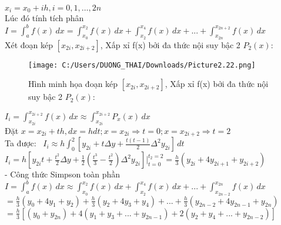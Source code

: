 \documentclass[14pt,a4paper]{article}
\begin{document}
 	   \hspace*{30pt}${\displaystyle x_i=x_0+ih ,i=0,1,…,2n }$ \\
 	   \hspace*{30pt} Lúc đó tính tích phân ${\displaystyle I= \int_{a}^{b}f(x)\,dx =\int_{x_0}^{x_2}f(x)\,dx +\int_{x_2}^{x_4}f(x)\,dx+ ... + \int_{x_{2n}}^{x_{2n+2}}f(x)\,dx}$ \\
 	   \hspace*{30pt} Xét đoạn kép ${\displaystyle  [x_{2i}, x_{2i+2}]}$, Xấp xỉ f(x) bởi đa thức nội suy bậc 2 ${\displaystyle P_2 (x): }$ \\ \vspace{9pt}
\begin{figure}[H]
	\centering
	\texttt{[image: C:/Users/DUONG\_THAI/Downloads/Picture2.22.png]}
	\caption[ Hình minh họa đoạn kép ${\displaystyle  [x_{2i}, x_{2i+2}]}$, Xấp xỉ f(x) bởi đa thức nội suy bậc 2 ${\displaystyle P_2 (x): }$]{ Hình minh họa đoạn kép ${\displaystyle  [x_{2i}, x_{2i+2}]}$, Xấp xỉ f(x) bởi đa thức nội suy bậc 2 ${\displaystyle P_2 (x): }$}
	\label{hinh22}
\end{figure} 	     
 	  \vspace{9pt} \hspace*{30pt} ${\displaystyle I_i= \int_{x_{2i}}^{x_{2i+2}}f(x)\,dx \approx \int_{x_{2i}}^{x_{2i+2}}P_x(x)\,dx}$ \\ 
 	 \vspace*{9pt} \hspace*{30pt} Đặt ${\displaystyle x= x_{2i} +th , dx= hdt ; x=x_{2i} \Rightarrow t=0 ; x= x_{2i+2} \Rightarrow t= 2 }$ \\ 
 	 \vspace{9pt} \hspace*{30pt} Ta được: \,  ${\displaystyle   I_i \approx h \int_{0}^{2}[y_{2i} +t\Delta y +\frac{t(t-1)}{2} \Delta^2y_{2i}]\,dt}$ \\
 	 \vspace{9pt} \hspace*{30pt}  ${\displaystyle I_i  =h[y_{2i} t+  \frac{t^2}{2}  \Delta y + \frac{1}{2} ( \frac {t^3}{3}-\frac{t^2}{2}  ) \Delta ^2 y_{2i} ]|_{t=0}^{t_2=2}  =   \frac{h}{3}(y_{2i}+4y_{2i+1}+y_{2i+2} ) }$\\
 	 \vspace{9pt} \hspace*{30pt} -	Công thức Simpson toàn phần \\
 	 \vspace{9pt} \hspace*{30pt} ${\displaystyle I=\int_{a}^{b}f(x)\,dx \approx \int_{x_0}^{x_2}f(x)\,dx +\int_{x_2}^{x_4}f(x)\,dx+ ... + \int_{x_{2n-2}}^{x_{2n}}f(x)\,dx}$ \\ 
 	 \vspace{9pt} \hspace*{35pt}   ${\displaystyle	=\frac{h}{3}(y_0+4y_1+y_2) +\frac{h}{3}(y_2+4y_3+y_4) + ...+ \frac{h}{3}(y_{2n-2}+4y_{2n-1}+y_{2n}) }$\\
 	 \vspace{9pt} \hspace*{35pt}   ${\displaystyle= \frac{h}{3}[(y_0+y_{2n})+4(y_1+y_3 +...+y_{2n-1})+2(y_2+y_4 +...+y_{2n-2})]}$
\end{document}
